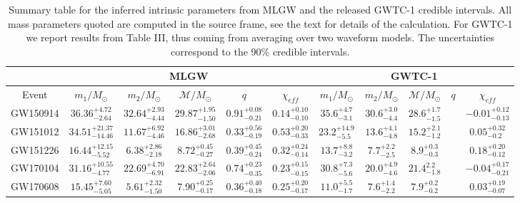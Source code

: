\begin{table}[]
\centering
\caption{Summary table for the inferred intrinsic parameters from MLGW and the released GWTC-1 credible intervals. All mass parameters quoted are computed in the source frame, see the text for details of the calculation. For GWTC-1 we report results from Table III, thus coming from averaging over two waveform models. The uncertainties correspond to the 90\% credible intervals.}
\label{tab:summary}
\begin{tabular}{cccccc|ccccc}
                              & \multicolumn{5}{c}{MLGW}                                                   & \multicolumn{5}{c|}{GWTC-1}                                                \\ \hline
\multicolumn{1}{c|}{Event}    & $m_1/M_\odot$ & $m_2/M_\odot$ & $\mathcal{M}/M_\odot$ & $q$ & $\chi_{eff}$ & $m_1/M_\odot$ & $m_2/M_\odot$ & $\mathcal{M}/M_\odot$ & $q$ & $\chi_{eff}$ \\ \hline
\multicolumn{1}{c|}{GW150914} & $36.36_{-2.64}^{+4.72}$& $32.64_{-4.44}^{+2.93}$& $29.87_{-1.50}^{+1.95}$& $0.91_{-0.21}^{+0.08}$& $0.14_{-0.10}^{+0.10}$&    $35.6_{-3.1}^{+4.7}$           &   $30.6_{-4.4}^{+3.0}$            & $28.6_{-1.5}^{+1.7}$                      &     & $-0.01_{-0.13}^{+0.12}$              \\
\multicolumn{1}{c|}{GW151012}& $34.51_{-14.46}^{+21.37}$& $11.67_{-4.46}^{+6.92}$& $16.86_{-2.68}^{+3.01}$& $0.33_{-0.19}^{+0.56}$& $0.53_{-0.33}^{+0.20}$&   $23.2_{-5.5}^{+14.9}$            &   $13.6_{-4.8}^{+4.1}$            &  $15.2_{-1.2}^{+2.1}$                     &     & $0.05_{-0.2}^{+0.32}$              \\
\multicolumn{1}{c|}{GW151226} & $16.44_{-5.52}^{+12.15}$& $6.38_{-2.18}^{+2.86}$& $8.72_{-0.27}^{+0.45}$& $0.39_{-0.24}^{+0.45}$& $0.32_{-0.14}^{+0.24}$&   $13.7_{-3.2}^{+8.8}$            & $7.7_{-2.5}^{+2.2}$               &  $8.9_{-0.3}^{+0.3}$                     &     & $0.18_{-0.12}^{+0.20}$              \\
\multicolumn{1}{c|}{GW170104} & $31.16_{-4.77}^{+10.55}$& $22.69_{-6.91}^{+4.70}$& $22.83_{-2.06}^{+2.64}$& $0.74_{-0.35}^{+0.23}$& $0.23_{-0.15}^{+0.15}$&  $30.8_{-5.6}^{+7.3}$             & $20.0_{-4.6}^{+4.9}$              & $21.4_{-1.8}^{2.2}$                       &     & $-0.04_{-0.21}^{+0.17}$             \\
\multicolumn{1}{c|}{GW170608} & $15.45_{-5.05}^{+7.60}$& $5.61_{-1.50}^{+2.32}$& $7.90_{-0.17}^{+0.25}$& $0.36_{-0.18}^{+0.40}$& $0.25_{-0.17}^{+0.20}$&  $11.0_{-1.7}^{+5.5}$             & $7.6_{-2.2}^{+1.4}$              &      $7.9_{-0.2}^{+0.2}$                  &     &   $0.03_{-0.07}^{+0.19}$           \\

\end{tabular}
\end{table}
